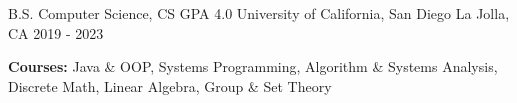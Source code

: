 
\begin{cventries}
  \cventry
    {B.S. Computer Science, CS GPA 4.0}
    {University of California, San Diego}
    {La Jolla, CA}
    {2019 - 2023}
    {
      \begin{cvitems}
        \item {\textbf{Courses:} Java \& OOP, Systems Programming, Algorithm \& Systems Analysis, Discrete Math, Linear Algebra, Group \& Set Theory}
      \end{cvitems}
    }
\end{cventries}
